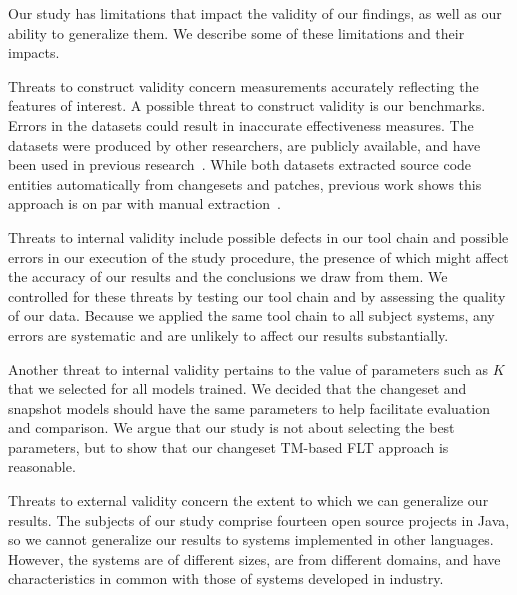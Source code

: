 

Our study has limitations that impact the validity of our findings,
as well as our ability to generalize them.
We describe some of these limitations and their impacts.

Threats to construct validity concern measurements accurately reflecting the features of interest.
A possible threat to construct validity is our benchmarks.
Errors in the datasets could result in inaccurate effectiveness measures.
The datasets were produced by other researchers, are publicly available,
and have been used in previous research~\cite{Dit-etal:2013, Revelle-etal:2010, Moreno-etal:2014}.
While both datasets extracted source code entities automatically from changesets and patches,
previous work shows this approach is on par with manual extraction~\cite{Corley-etal:2011}.

Threats to internal validity include possible defects in our tool chain and possible errors
in our execution of the study procedure,
the presence of which might affect the accuracy of our results and the conclusions we draw from them.
We controlled for these threats by testing our tool chain and by assessing the quality of our data.
Because we applied the same tool chain to all subject systems, any errors are systematic and are unlikely
to affect our results substantially.

Another threat to internal validity pertains to the value of parameters such as $K$ that we selected for all models trained.
We decided that the changeset and snapshot models should have the same parameters to help facilitate evaluation and comparison.
We argue that our study is not about selecting the best parameters,
but to show that our changeset TM-based FLT approach is reasonable.

Threats to external validity concern the extent to which we can generalize our results.
The subjects of our study comprise fourteen open source projects in Java,
so we cannot generalize our results to systems implemented in other languages.
However, the systems are of different sizes, are from different domains, and
have characteristics in common with those of systems developed in industry.

